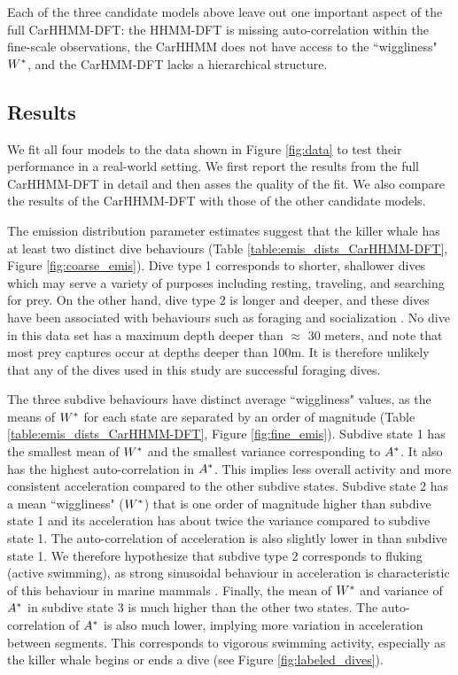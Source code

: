 Each of the three candidate models above leave out one important aspect of the full CarHHMM-DFT: the HHMM-DFT is missing auto-correlation within the fine-scale observations, the CarHHMM does not have access to the ``wiggliness" $W^*$, and the CarHMM-DFT lacks a hierarchical structure.

\subsection{Results}

We fit all four models to the data shown in Figure \ref{fig:data} to test their performance in a real-world setting. We first report the results from the full CarHHMM-DFT in detail and then asses the quality of the fit. We also compare the results of the CarHHMM-DFT with those of the other candidate models.

The emission distribution parameter estimates suggest that the killer whale has at least two distinct dive behaviours (Table \ref{table:emis_dists_CarHHMM-DFT}, Figure \ref{fig:coarse_emis}). 
Dive type 1 corresponds to shorter, shallower dives which may serve a variety of purposes including resting, traveling, and searching for prey.
On the other hand, dive type 2 is longer and deeper, and these dives have been associated with behaviours such as foraging and socialization \citep{Tennessen:2019b}. No dive in this data set has a maximum depth deeper than $\approx$ 30 meters, and \citet{Wright:2017} note that most prey captures occur at depths deeper than 100m. It is therefore unlikely that any of the dives used in this study are successful foraging dives.

The three subdive behaviours have distinct average ``wiggliness" values, as the means of $W^*$ for each state are separated by an order of magnitude (Table \ref{table:emis_dists_CarHHMM-DFT}, Figure \ref{fig:fine_emis}). 
Subdive state 1 has the smallest mean of $W^*$ and the smallest variance corresponding to $A^*$. It also has the highest auto-correlation in $A^*$. This implies less overall activity and more consistent acceleration compared to the other subdive states. 
Subdive state 2 has a mean ``wiggliness" ($W^*$) that is one order of magnitude higher than subdive state 1 and its acceleration has about twice the variance compared to subdive state 1. The auto-correlation of acceleration is also slightly lower in than subdive state 1. We therefore hypothesize that subdive type 2 corresponds to fluking (active swimming), as strong sinusoidal behaviour in acceleration is characteristic of this behaviour in marine mammals \citep{Simon:2012}.
Finally, the mean of $W^*$ and variance of $A^*$ in subdive state 3 is much higher than the other two states. The auto-correlation of $A^*$ is also much lower, implying more variation in acceleration between segments. This corresponds to vigorous swimming activity, especially as the killer whale begins or ends a dive (see Figure \ref{fig:labeled_dives}). 

